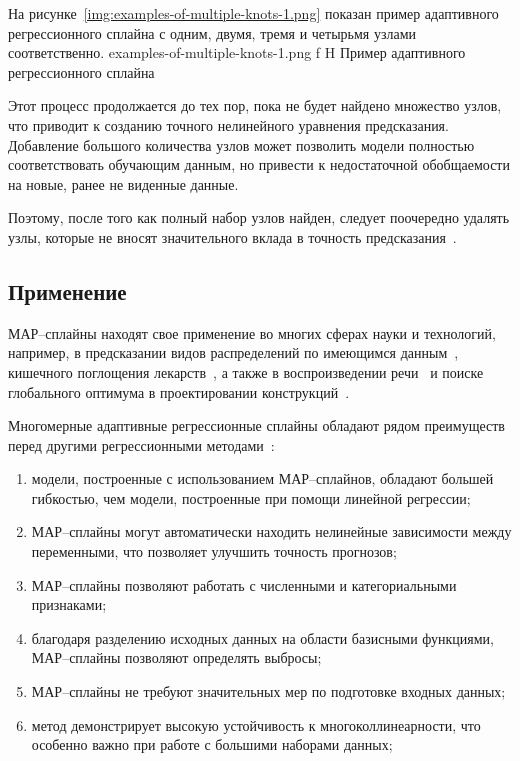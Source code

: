 На рисунке~\ref{img:examples-of-multiple-knots-1.png} показан пример адаптивного регрессионного сплайна с одним, двумя, тремя и четырьмя узлами соответственно.
{examples-of-multiple-knots-1.png}
{f}
{H}
{\textwidth}
{Пример адаптивного регрессионного сплайна}

Этот процесс продолжается до тех пор, пока не будет найдено множество узлов, что приводит к созданию точного нелинейного уравнения предсказания.
Добавление большого количества узлов может позволить модели полностью соответствовать обучающим данным, но привести к недостаточной обобщаемости на новые, ранее не виденные данные.

Поэтому, после того как полный набор узлов найден, следует поочередно удалять узлы, которые не вносят значительного вклада в точность предсказания~\cite{gitbook}.

\subsection*{Применение}

МАР--сплайны находят свое применение во многих сферах науки и технологий, например, в предсказании видов распределений по имеющимся данным~\cite{elith2007}, кишечного поглощения лекарств~\cite{deconinck2007}, а также в воспроизведении речи~\cite{haas1998} и поиске глобального оптимума в проектировании конструкций~\cite{crino2007}.

Многомерные адаптивные регрессионные сплайны обладают рядом преимуществ перед другими регрессионными методами~\cite{fedosin}:
\begin{enumerate}[label=\arabic*), leftmargin=1.6\parindent]
    \item модели, построенные с использованием МАР--сплайнов, обладают большей гибкостью, чем модели, построенные при помощи линейной регрессии;
    \item МАР--сплайны могут автоматически находить нелинейные зависимости между переменными, что позволяет улучшить точность прогнозов;
    \item МАР--сплайны позволяют работать с численными и категориальными признаками;
    \item благодаря разделению исходных данных на области базисными функциями, МАР--сплайны позволяют определять выбросы;
    \item МАР--сплайны не требуют значительных мер по подготовке входных данных;
    \item метод демонстрирует высокую устойчивость к многоколлинеарности, что особенно важно при работе с большими наборами данных;
\end{enumerate}

